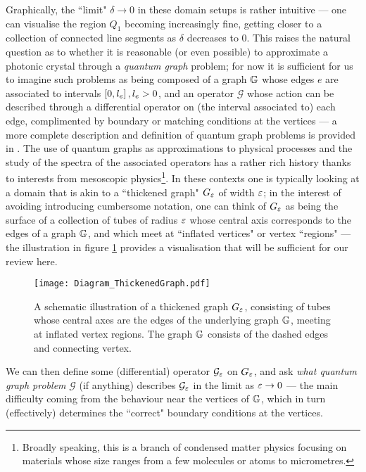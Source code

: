 Graphically, the ``limit" $\delta\rightarrow0$ in these domain setups is rather intuitive --- one can visualise the region $Q_1$ becoming increasingly fine, getting closer to a collection of connected line segments as $\delta$ decreases to 0.
This raises the natural question as to whether it is reasonable (or even possible) to approximate a photonic crystal through a \emph{quantum graph} problem; for now it is sufficient for us to imagine such problems as being composed of a graph $\mathbb{G}$ whose edges $e$ are associated to intervals $\left[ 0,l_{e} \right], l_{e}>0$, and an operator $\mathcal{G}$ whose action can be described through a differential operator on (the interval associated to) each edge, complimented by boundary or matching conditions at the vertices --- a more complete description and definition of quantum graph problems is provided in .
The use of quantum graphs as approximations to physical processes and the study of the spectra of the associated operators has a rather rich history thanks  to interests from mesoscopic physics\footnote{Broadly speaking, this is a branch of condensed matter physics focusing on materials whose size ranges from a few molecules or atoms to micrometres.}.
In these contexts one is typically looking at a domain that is akin to a ``thickened graph" $G_{\varepsilon}$ of width $\varepsilon$; in the interest of avoiding introducing cumbersome notation, one can think of $G_{\varepsilon}$ as being the surface of a collection of tubes of radius $\varepsilon$ whose central axis corresponds to the edges of a graph $\mathbb{G}$, and which meet at ``inflated vertices" or vertex ``regions" --- the illustration in figure \ref{fig:Diagram_ThickenedGraph} provides a visualisation that will be sufficient for our review here.
\begin{figure}[b]
	\centering
	\texttt{[image: Diagram\_ThickenedGraph.pdf]}
	\caption{\label{fig:Diagram_ThickenedGraph} A schematic illustration of a thickened graph $G_{\varepsilon}$, consisting of tubes whose central axes are the edges of the underlying graph $\mathbb{G}$, meeting at inflated vertex regions. The graph $\mathbb{G}$ consists of the dashed edges and connecting vertex.}
\end{figure}
We can then define some (differential) operator $\mathcal{G}_{\varepsilon}$ on $G_{\varepsilon}$, and ask \emph{what quantum graph problem} $\mathcal{G}$ (if anything) describes $\mathcal{G}_{\varepsilon}$ in the limit as $\varepsilon\rightarrow0$ --- the main difficulty coming from the behaviour near the vertices of $\mathbb{G}$, which in turn (effectively) determines the ``correct" boundary conditions at the vertices.
